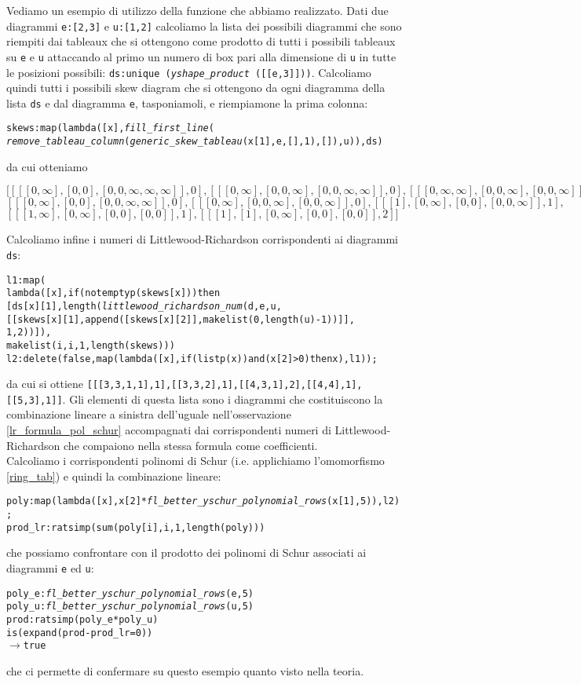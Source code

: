Vediamo un esempio di utilizzo della funzione che abbiamo realizzato.
Dati due diagrammi \texttt{e:[2,3]} e \texttt{u:[1,2]} calcoliamo la
lista dei possibili diagrammi che sono riempiti dai tableaux che si
ottengono come prodotto di tutti i possibili tableaux su \texttt{e} e
\texttt{u} attaccando al primo un numero di box pari alla dimensione
di \texttt{u} in tutte le posizioni possibili:
\texttt{ds:unique (\emph{yshape\_product} ([[e,3]]))}. Calcoliamo
quindi tutti i possibili skew diagram che si ottengono da ogni
diagramma della lista \texttt{ds} e dal diagramma \texttt{e},
tasponiamoli, e riempiamone la prima colonna:
\begin{alltt}
skews:map (lambda ([x], \emph{fill\_first\_line} (
  \emph{remove\_tableau\_column} (\emph{generic\_skew\_tableau} (x[1], e, [], 1),[]), u)), ds)
\end{alltt}
da cui otteniamo
\begin{alltt}
\([[[[0,\infty],[0,0],[0,0,\infty,\infty,\infty]],0],[[[0,\infty],[0,0,\infty],[0,0,\infty,\infty]],0],[[[0,\infty,\infty],[0,0,\infty],[0,0,\infty]],0],\)
\([[[0,\infty],[0,0],[0,0,\infty,\infty]],0],[[[0,\infty],[0,0,\infty],[0,0,\infty]],0],[[[1],[0,\infty],[0,0],[0,0,\infty]],1],\)
\([[[1,\infty],[0,\infty],[0,0],[0,0]],1],[[[1],[1],[0,\infty],[0,0],[0,0]],2]]\)
\end{alltt}

Calcoliamo infine i numeri di Littlewood-Richardson corrispondenti ai
diagrammi \texttt{ds}:
\begin{alltt}
l1:map (
    lambda ([x], if (not emptyp (skews[x])) then 
      [ds[x][1],length(\emph{littlewood\_richardson\_num}(d,e,u,
                      [[skews[x][1],append([skews[x][2]],makelist(0,length(u)-1))]],
                      1,2))]),
    makelist (i,i,1,length (skews)))
l2 : delete (false, map (lambda ([x], if (listp (x)) and (x[2] > 0) then x ), l1));
\end{alltt}
da cui si ottiene
\texttt{[[[3,3,1,1],1],[[3,3,2],1],[[4,3,1],2],[[4,4],1],[[5,3],1]]}.
Gli elementi di questa lista sono i diagrammi che costituiscono la combinazione lineare a sinistra
dell'uguale nell'osservazione \ref{lr_formula_pol_schur} accompagnati
dai corrispondenti numeri di Littlewood-Richardson che compaiono nella
stessa formula come coefficienti.\\
Calcoliamo i corrispondenti polinomi di Schur (i.e. applichiamo
l'omomorfismo \eqref{ring_tab}) e quindi la combinazione lineare:
\begin{alltt}
poly:map (lambda ([x], x[2]*\emph{fl\_better\_yschur\_polynomial\_rows} (x[1],5)), l2);
prod\_lr:ratsimp (sum (poly[i],i,1,length(poly)))
\end{alltt}
che possiamo confrontare con il prodotto dei polinomi di Schur
associati ai diagrammi \texttt{e} ed \texttt{u}:
\begin{alltt}
poly\_e:\emph{fl\_better\_yschur\_polynomial\_rows} (e,5)
poly\_u:\emph{fl\_better\_yschur\_polynomial\_rows} (u,5)
prod:ratsimp (poly\_e*poly\_u)
is (expand (prod - prod\_lr = 0))
\(\rightarrow\) true
\end{alltt}
che ci permette di confermare su questo esempio quanto visto nella teoria.
